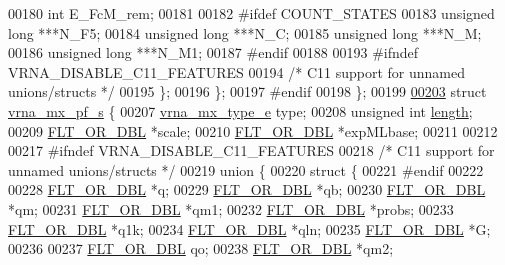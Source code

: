 \begin{DoxyCode}
00180   \textcolor{keywordtype}{int}           E\_FcM\_rem;
00181 
00182 \textcolor{preprocessor}{#ifdef COUNT\_STATES}
00183   \textcolor{keywordtype}{unsigned} \textcolor{keywordtype}{long} ***N\_F5;
00184   \textcolor{keywordtype}{unsigned} \textcolor{keywordtype}{long} ***N\_C;
00185   \textcolor{keywordtype}{unsigned} \textcolor{keywordtype}{long} ***N\_M;
00186   \textcolor{keywordtype}{unsigned} \textcolor{keywordtype}{long} ***N\_M1;
00187 \textcolor{preprocessor}{#endif}
00188 
00193 \textcolor{preprocessor}{#ifndef VRNA\_DISABLE\_C11\_FEATURES}
00194   \textcolor{comment}{/* C11 support for unnamed unions/structs */}
00195 \};
00196 \};
00197 \textcolor{preprocessor}{#endif}
00198 \};
00199 
\hyperlink{group__dp__matrices}{00203} \textcolor{keyword}{struct }\hyperlink{group__dp__matrices_structvrna__mx__pf__s}{vrna\_mx\_pf\_s} \{
00207   \hyperlink{group__dp__matrices_ga6042ea1d58d01931e959791be6d89343}{vrna\_mx\_type\_e} type;
00208   \textcolor{keywordtype}{unsigned} \textcolor{keywordtype}{int} \hyperlink{group__dp__matrices_a1f92a8406fc1fb721dbf9193c34ad826}{length};
00209   \hyperlink{group__data__structures_ga31125aeace516926bf7f251f759b6126}{FLT\_OR\_DBL} *scale;
00210   \hyperlink{group__data__structures_ga31125aeace516926bf7f251f759b6126}{FLT\_OR\_DBL} *expMLbase;
00211 
00212 
00217 \textcolor{preprocessor}{#ifndef VRNA\_DISABLE\_C11\_FEATURES}
00218   \textcolor{comment}{/* C11 support for unnamed unions/structs */}
00219   \textcolor{keyword}{union }\{
00220     \textcolor{keyword}{struct }\{
00221 \textcolor{preprocessor}{#endif}
00222 
00228   \hyperlink{group__data__structures_ga31125aeace516926bf7f251f759b6126}{FLT\_OR\_DBL} *q;
00229   \hyperlink{group__data__structures_ga31125aeace516926bf7f251f759b6126}{FLT\_OR\_DBL} *qb;
00230   \hyperlink{group__data__structures_ga31125aeace516926bf7f251f759b6126}{FLT\_OR\_DBL} *qm;
00231   \hyperlink{group__data__structures_ga31125aeace516926bf7f251f759b6126}{FLT\_OR\_DBL} *qm1;
00232   \hyperlink{group__data__structures_ga31125aeace516926bf7f251f759b6126}{FLT\_OR\_DBL} *probs;
00233   \hyperlink{group__data__structures_ga31125aeace516926bf7f251f759b6126}{FLT\_OR\_DBL} *q1k;
00234   \hyperlink{group__data__structures_ga31125aeace516926bf7f251f759b6126}{FLT\_OR\_DBL} *qln;
00235   \hyperlink{group__data__structures_ga31125aeace516926bf7f251f759b6126}{FLT\_OR\_DBL} *G;
00236 
00237   \hyperlink{group__data__structures_ga31125aeace516926bf7f251f759b6126}{FLT\_OR\_DBL} qo;
00238   \hyperlink{group__data__structures_ga31125aeace516926bf7f251f759b6126}{FLT\_OR\_DBL} *qm2;

\end{DoxyCode}
